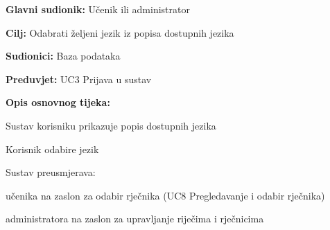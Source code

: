 \noindent {}
\begin{packed_item}

	\item \textbf{Glavni sudionik: } Učenik ili administrator
	\item \textbf{Cilj: } Odabrati željeni jezik iz popisa dostupnih jezika
	\item \textbf{Sudionici: } Baza podataka
	\item \textbf{Preduvjet: } UC3 Prijava u sustav
	\item  \textbf{Opis osnovnog tijeka:}
	
	\item[] \begin{packed_enum}

		\item Sustav korisniku prikazuje popis dostupnih jezika
		\item Korisnik odabire jezik
		\item Sustav preusmjerava:
		
		\item[] \begin{packed_item}

			\item učenika na zaslon za odabir rječnika (UC8 Pregledavanje i odabir rječnika)
			\item administratora na zaslon za upravljanje riječima i rječnicima
		
		\end{packed_item}

	\end{packed_enum}
	
\end{packed_item}


